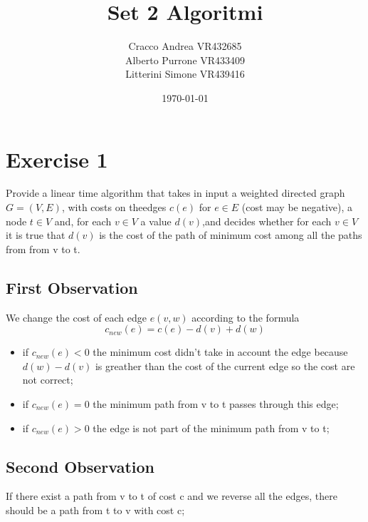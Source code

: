 \documentclass[]{article}
\begin{document}
\title{Set 2 Algoritmi}
\author{Cracco Andrea VR432685\\Alberto Purrone VR433409\\Litterini Simone VR439416\\}
\date{\today}
\maketitle




\section{Exercise 1}

Provide a linear time algorithm that takes in input a weighted directed graph $G = (V, E)$, with costs on theedges $c(e)$ for $e∈E$ (cost may be negative), a node $t∈V$ and, for each $v∈V$ a value $d(v)$,and decides whether for each $v ∈ V$ it is true that $d(v)$ is the cost of the path of minimum cost among all the paths from from v to t.

\subsection{First Observation}

We change the cost of each edge $e(v,w)$ according to the formula $$ c_{new}(e) = c(e)-d(v)+d(w)$$ 

\begin{itemize}

\item if $c_{new}(e)  < 0$ the minimum cost didn't take in account the edge because $d(w) - d(v)$ is greather than the cost of the current edge so the cost are not correct;

\item if $c_{new}(e)  = 0$ the minimum path from v to t passes through this edge;

\item if $c_{new}(e)  > 0$ the edge is not part of the minimum path from v to t;


\end{itemize}

\subsection{Second Observation}

If there exist a path from v to t of cost c and we reverse all the edges, there should be a path from t to v with cost c;
\end{document}
